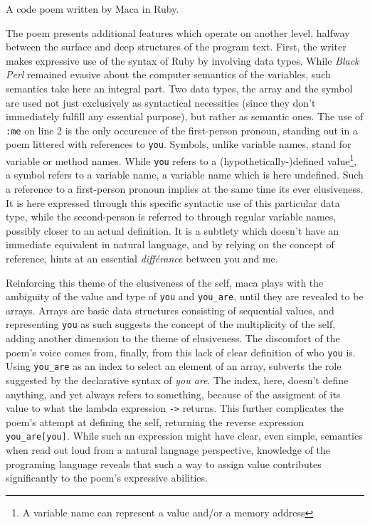 \begin{listing}
  \inputminted{ruby}{./corpus/self_inspect.rb}
  \caption{A code poem written by Maca in Ruby. \citep{ortega_maca_2011}}
  \label{code:self_inspect}
\end{listing}

The poem presents additional features which operate on another level, halfway between the surface and deep structures of the program text. First, the writer makes expressive use of the syntax of Ruby by involving data types. While \emph{Black Perl} remained evasive about the computer semantics of the variables, such semantics take here an integral part. Two data types, the array and the symbol are used not just exclusively as syntactical necessities (since they don't immediately fulfill any essential purpose), but rather as semantic ones. The use of \lstinline{:me} on line 2 is the only occurence of the first-person pronoun, standing out in a poem littered with references to \lstinline{you}. Symbols, unlike variable names, stand for variable or method names. While \lstinline{you} refers to a (hypothetically-)defined value\footnote{A variable name can represent a value and/or a memory address}, a symbol refers to a variable name, a variable name which is here undefined. Such a reference to a first-person pronoun implies at the same time its ever elusiveness. It is here expressed through this specific syntactic use of this particular data type, while the second-person is referred to through regular variable names, possibly closer to an actual definition. It is a subtlety which doesn't have an immediate equivalent in natural language, and by relying on the concept of reference, hints at an essential \emph{différance} between you and me.

Reinforcing this theme of the elusiveness of the self, maca plays with the ambiguity of the value and type of \lstinline{you} and \lstinline{you_are}, until they are revealed to be arrays. Arrays are basic data structures consisting of sequential values, and representing \lstinline{you} as such suggests the concept of the multiplicity of the self, adding another dimension to the theme of elusiveness. The discomfort of the poem's voice comes from, finally, from this lack of clear definition of who \lstinline{you} is. Using \lstinline{you_are} as an index to select an element of an array, subverts the role suggested by the declarative syntax of \emph{you are}. The index, here, doesn't define anything, and yet always refers to something, because of the assigment of its value to what the lambda expression \lstinline{->} returns. This further complicates the poem's attempt at defining the self, returning the reverse expression \lstinline{you_are[you]}. While such an expression might have clear, even simple, semantics when read out loud from a natural language perspective, knowledge of the programing language reveals that such a way to assign value contributes significantly to the poem's expressive abilities.

